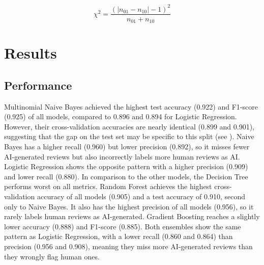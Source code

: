\documentclass[pmlr]{jmlr}%
\begin{document}
\begin{equation}\label{eq:mcnemar}
\chi^2 = \frac{\left(|n_{01} - n_{10}| - 1\right)^2}{n_{01} + n_{10}}
\end{equation}

\section{Results}
\label{sec:results}
\subsection{Performance}
\label{sec:performance}

Multinomial Naive Bayes achieved the highest test accuracy (0.922) and F1-score (0.925) of all models, compared to 0.896 and 0.894 for Logistic Regression.
However, their cross-validation accuracies are nearly identical (0.899 and 0.901), suggesting that the gap on the test set may be specific to this split (see ).
Naive Bayes has a higher recall (0.960) but lower precision (0.892), so it misses fewer AI-generated reviews but also incorrectly labels more human reviews as AI.
Logistic Regression shows the opposite pattern with a higher precision (0.909) and lower recall (0.880).
In comparison to the other models, the Decision Tree performs worst on all metrics.
Random Forest achieves the highest cross-validation accuracy of all models (0.905) and a test accuracy of 0.910, second only to Naive Bayes.
It also has the highest precision of all models (0.956), so it rarely labels human reviews as AI-generated.
Gradient Boosting reaches a slightly lower accuracy (0.888) and F1-score (0.885).
Both ensembles show the same pattern as Logistic Regression, with a lower recall (0.860 and 0.864) than precision (0.956 and 0.908), meaning they miss more AI-generated reviews than they wrongly flag human ones.
\end{document}
